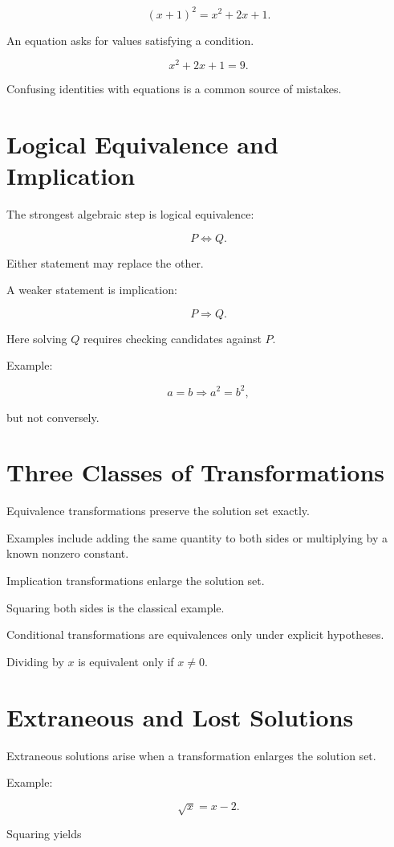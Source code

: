 \documentclass{essay}
\begin{document}
\[ (x+1)^{2}=x^{2}+2x+1. \]

An equation asks for values satisfying a condition.

\[ x^{2}+2x+1=9. \]

Confusing identities with equations is a common source of mistakes.

\section{Logical Equivalence and Implication}

The strongest algebraic step is logical equivalence:

\[ P\iff Q. \]

Either statement may replace the other.

A weaker statement is implication:

\[ P\Rightarrow Q. \]

Here solving \(Q\) requires checking candidates against \(P\).

Example:

\[ a=b\Rightarrow a^{2}=b^{2}, \]

but not conversely.

\section{Three Classes of Transformations}

Equivalence transformations preserve the solution set exactly.

Examples include adding the same quantity to both sides or multiplying by a
known nonzero constant.

Implication transformations enlarge the solution set.

Squaring both sides is the classical example.

Conditional transformations are equivalences only under explicit hypotheses.

Dividing by \(x\) is equivalent only if \(x\neq0\).

\section{Extraneous and Lost Solutions}

Extraneous solutions arise when a transformation enlarges the solution set.

Example:

\[ \sqrt{x}=x-2. \]

Squaring yields
\end{document}
